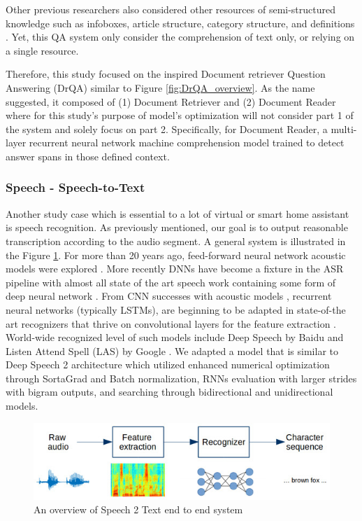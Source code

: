 Other previous researchers also considered other resources of semi-structured knowledge such as infoboxes, article structure, category structure, and definitions \cite{Ryu}. Yet, this QA system only consider the comprehension of text only, or relying on a single resource.
    
    






Therefore, this study focused on the inspired Document retriever Question Answering (DrQA) similar to Figure \ref{fig:DrQA_overview}. As the name suggested, it composed of (1) Document Retriever and (2) Document Reader where for this study's purpose of model's optimization will not consider part 1 of the system and solely focus on part 2. Specifically, for Document
Reader, a multi-layer recurrent neural network
machine comprehension model trained to detect
answer spans in those defined context.




\subsubsection{Speech - Speech-to-Text}

Another study case which is essential to a lot of virtual or smart home assistant is speech recognition. As previously mentioned, our goal is to output reasonable transcription according to the audio segment. A general system is illustrated in the Figure \ref{fig:speech2text}. For more than 20 years ago, feed-forward
neural network acoustic models were explored \cite{acoustic} \cite{acoustic2}.  More recently DNNs have become a fixture in the ASR pipeline with almost all
state of the art speech work containing some form of deep neural network \cite{DNN}. From CNN successes with acoustic models \cite{CNNacoustics}, recurrent
neural networks (typically LSTMs), are beginning to be adapted in state-of-the art recognizers \cite{recognizers} that thrive on convolutional layers for the feature extraction \cite{featextr}. World-wide recognized level of such models include Deep Speech by Baidu \cite{deepspeech} and Listen Attend Spell (LAS) by Google \cite{LAS}. We adapted a model that is similar to Deep Speech 2 architecture \cite{deepspeech} which utilized enhanced numerical optimization through SortaGrad and Batch normalization, RNNs evaluation with larger strides with bigram outputs, and searching through bidirectional and unidirectional models.


\begin{figure}[!t]
    \centering
    \includegraphics[width=\linewidth]{img/speech2text.jpg}
    \caption{An overview of Speech 2 Text end to end system}
    \label{fig:speech2text}
\end{figure}


